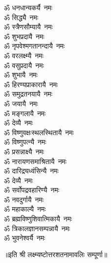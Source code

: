 \begin{multicols}{2}
\begin{flushleft}
ॐ धनधान्यकर्यै~नमः\\
ॐ सिद्ध्यै~नमः\\
ॐ स्त्रैणसौम्यायै~नमः\\
ॐ शुभप्रदायै~नमः\\
ॐ नृपवेश्मगतानन्दायै~नमः\\
ॐ वरलक्ष्म्यै~नमः\\
ॐ वसुप्रदायै~नमः\hfill{}\\
ॐ शुभायै~नमः\\
ॐ हिरण्यप्राकारायै~नमः\\
ॐ समुद्रतनयायै~नमः\\
ॐ जयायै~नमः\\
ॐ मङ्गलायै~नमः\\
ॐ देव्यै~नमः\\
ॐ विष्णुवक्षःस्थलस्थितायै~नमः\\
ॐ विष्णुपत्न्यै~नमः\\
ॐ प्रसन्नाक्ष्यै~नमः\\
ॐ नारायणसमाश्रितायै~नमः\hfill{}\\
ॐ दारिद्र्यध्वंसिन्यै~नमः\\
ॐ देव्यै~नमः\\
ॐ सर्वोपद्रवहारिण्यै~नमः\\
ॐ नवदुर्गायै~नमः\\
ॐ महाकाल्यै~नमः\\
ॐ ब्रह्मविष्णुशिवात्मिकायै~नमः\\
ॐ त्रिकालज्ञानसम्पन्नायै~नमः\\
ॐ भुवनेश्वर्यै~नमः\\
\end{flushleft}
\end{multicols}
॥इति श्री लक्ष्म्यष्टोत्तरशतनामावलिः सम्पूर्णा॥
